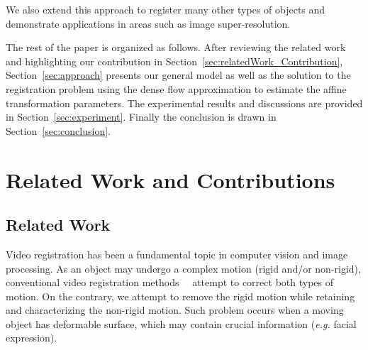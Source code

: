 \documentclass[10pt,journal]{IEEEtran}
\begin{document}
We also extend this approach to register many other types of objects and demonstrate applications in areas such as image super-resolution. 

The rest of the paper is organized as follows. After reviewing the related work and highlighting our contribution in Section~\ref{sec:relatedWork_Contribution}, Section~\ref{sec:approach} presents our general model as well as the solution to the registration problem using the dense flow approximation to estimate the affine transformation parameters. The experimental results and discussions are provided in Section~\ref{sec:experiment}. Finally the conclusion is drawn in Section~\ref{sec:conclusion}.


\section{\label{sec:relatedWork_Contribution}Related Work and Contributions}

\subsection{\label{sec:related_work}Related Work}

Video registration has been a fundamental topic in computer vision and image processing. As an object may undergo a complex motion (rigid and/or non-rigid), conventional video registration methods~\cite{Uenohara95}~\cite{Caspi_PAMI02} attempt to correct both types of motion. On the contrary, we attempt to remove the rigid motion while retaining and characterizing the non-rigid motion. Such problem occurs when a moving object has deformable surface, which may contain crucial information (\textit{e.g.} facial expression).
\end{document}
